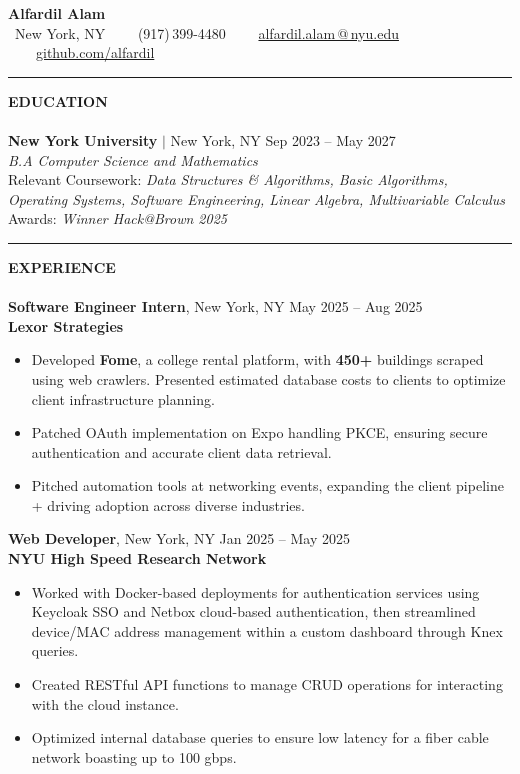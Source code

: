 \documentclass[11pt]{article}
\makeatletter
\newcommand{\name}{Alfardil Alam}
\newcommand{\addressCity}{New York, NY}
\newcommand{\phone}{(917)\,399-4480}
\newcommand{\email}{\href{mailto:aa11101@nyu.edu}{alfardil.alam\,@\,nyu.edu}}
\newcommand{\github}{\href{https://github.com/alfardil}{github.com/alfardil}}
\newcommand{\web}{\href{https://alfardil.com}{alfardil.com}}
\newcommand{\majors}{B.A Computer Science and Mathematics}
\newcommand{\coursework}{\scriptsize{Data Structures \& Algorithms, Basic Algorithms, Operating Systems, Software Engineering, Linear Algebra, Multivariable Calculus}}
\newcommand{\awards}{\scriptsize{Winner Hack@Brown 2025}}
\newcommand{\resumeSection}[1]{%
  \rule{0.04\textwidth}{0.4pt}%
  \textbf{\Large \uppercase{#1}}%
  \hrulefill\\[0.2em]
}
\newenvironment{resumeItemize}{%
  \setlist{nolistsep}
  \begin{itemize}[leftmargin=*, label=\textbullet, itemsep=0.3em]
}{%
  \end{itemize}
}
\newcommand{\resumeSubItem}[1]{\item \small #1}
\makeatother
\begin{document}
{\Huge \textbf{\name}} \\ [0.3em]
\faMapMarker \ \addressCity
\ \ \ \faMobile \ \phone
\ \ \ \faEnvelopeO \ \email
\ \ \ \faGithub \ \github

\bigskip

\resumeSection{Education} \\ [-0.6em]
\textbf{\Large New York University} $|$ New York, NY \hfill {\small Sep 2023 -- May 2027} \\
\textit{\majors}  \\ [0.2em]
\scriptsize{Relevant Coursework:} \textit{\coursework} \\
\scriptsize{Awards: }\textit{\awards}


\bigskip

\resumeSection{Experience}
\\[-0.7em]
\textbf{\large Software Engineer Intern}, New York, NY \hfill {\small May 2025 -- Aug 2025} \\ [0.25em]
\textbf{Lexor Strategies}
\begin{resumeItemize}
  \resumeSubItem{Developed \textbf{Fome}, a college rental platform, with \textbf{450+} buildings scraped using web crawlers.
    Presented estimated database costs to clients to optimize client infrastructure planning.}
  \resumeSubItem{Patched OAuth implementation on Expo handling PKCE, ensuring secure authentication and accurate client data retrieval.}
  \resumeSubItem{Pitched automation tools at networking events, expanding the client pipeline + driving adoption
    across diverse industries.}
\end{resumeItemize}

\medskip

\textbf{\large Web Developer}, New York, NY \hfill {\small Jan 2025 -- May 2025} \\ [0.25em]
\textbf{NYU High Speed Research Network}
\begin{resumeItemize}
  \resumeSubItem{Worked with Docker-based deployments for authentication services using Keycloak SSO and
    Netbox cloud-based authentication, then streamlined device/MAC address management within a custom dashboard
    through Knex queries.}
  \resumeSubItem{Created RESTful API functions to manage CRUD operations for interacting with
    the cloud instance.}
  \resumeSubItem{ Optimized internal database queries to ensure low latency for a fiber cable network boasting up to 100 gbps.}
\end{resumeItemize}
\end{document}
